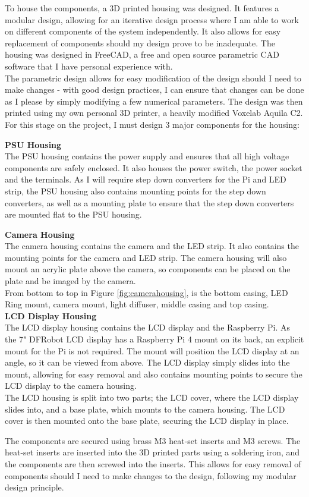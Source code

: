 To house the components, a 3D printed housing was designed. It features a modular design, allowing for an iterative design process
where I am able to work on different components of the system independently. It also allows for easy replacement of components
should my design prove to be inadequate. The housing was designed in FreeCAD\cite{freecad}, a free and open source parametric CAD software 
that I have personal experience with. \\
The parametric design allows for easy modification of the design should I need to make changes -
with good design practices, I can ensure that changes can be done as I please by simply modifying a few numerical parameters.
The design was then printed using my own personal 3D printer, a heavily modified Voxelab Aquila C2. For this stage on the project,
I must design 3 major components for the housing:

\noindent
\textbf{PSU Housing} \\
The PSU housing contains the power supply and ensures that all high voltage components are safely enclosed.
It also houses the power switch, the power socket and the terminals. As I will require step down converters for the Pi and LED strip,
the PSU housing also contains mounting points for the step down converters, as well as a mounting plate to ensure that the step down converters
are mounted flat to the PSU housing.

\noindent
\textbf{Camera Housing} \\
The camera housing contains the camera and the LED strip. It also contains the mounting points for the camera and LED strip.
The camera housing will also mount an acrylic plate above the camera, so components can be placed on the plate and be imaged by the camera. \\
From bottom to top in Figure \ref*{fig:camerahousing}, is the bottom casing, LED Ring mount, camera mount, light diffuser, middle casing and
top casing. \\

\noindent
\textbf{LCD Display Housing} \\
The LCD display housing contains the LCD display and the Raspberry Pi. As the 7" DFRobot LCD display has a Raspberry Pi 4 mount on its back,
an explicit mount for the Pi is not required. The mount will position the LCD display at an angle, so it can be viewed from above. The LCD display
simply slides into the mount, allowing for easy removal and also contains mounting points to secure the LCD display to the camera housing. \\
The LCD housing is split into two parts; the LCD cover, where the LCD display slides into, and a base plate, which mounts to the camera housing.
The LCD cover is then mounted onto the base plate, securing the LCD display in place.

The components are secured using brass M3 heat-set inserts and M3 screws. The heat-set inserts are inserted into the 3D printed parts using a soldering iron,
and the components are then screwed into the inserts. This allows for easy removal of components should I need to make changes to the design, following
my modular design principle.
